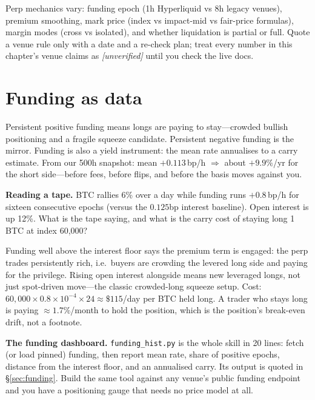 \begin{rulebox}
Perp mechanics vary: funding epoch (1h Hyperliquid vs 8h legacy venues), premium smoothing,
mark price (index vs impact-mid vs fair-price formulas), margin modes (cross vs isolated),
and whether liquidation is partial or full. Quote a venue rule only with a date and a re-check
plan; treat every number in this chapter's venue claims as \emph{[unverified]} until you check
the live docs.
\end{rulebox}

\section{Funding as data}\label{sec:funddata}

Persistent positive funding means longs are paying to stay---crowded bullish positioning and a
fragile squeeze candidate. Persistent negative funding is the mirror. Funding is also a yield
instrument: the mean rate annualises to a carry estimate. From our 500h snapshot:
mean $+0.113$\,bp/h $\Rightarrow$ about $+9.9\%$/yr for the short side---before fees, before
flips, and before the basis moves against you.

\begin{example}\label{ex:fundread}
\textbf{Reading a tape.} BTC rallies 6\% over a day while funding runs $+0.8$\,bp/h for
sixteen consecutive epochs (versus the $0.125$bp interest baseline). Open interest is up 12\%.
What is the tape saying, and what is the carry cost of staying long 1\,BTC at index 60{,}000?
\begin{solution}
Funding well above the interest floor says the premium term is engaged: the perp trades
persistently rich, i.e.\ buyers are crowding the levered long side and paying for the privilege.
Rising open interest alongside means new leveraged longs, not just spot-driven move---the
classic crowded-long squeeze setup. Cost: $60{,}000\times0.8\times10^{-4}\times24 \approx
\$115$/day per BTC held long. A trader who stays long is paying $\approx1.7\%$/month to hold
the position, which is the position's break-even drift, not a footnote.
\end{solution}
\end{example}

\begin{example}\label{ex:dash}
\textbf{The funding dashboard.} \texttt{funding\_hist.py} is the whole skill in 20 lines:
fetch (or load pinned) funding, then report mean rate, share of positive epochs, distance from
the interest floor, and an annualised carry. Its output is quoted in \S\ref{sec:funding}.
Build the same tool against any venue's public funding endpoint and you have a positioning
gauge that needs no price model at all.
\end{example}

